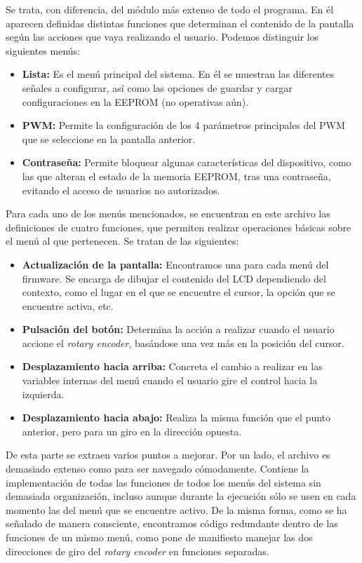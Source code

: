 Se trata, con diferencia, del módulo más extenso de todo el programa. En él aparecen definidas distintas funciones que determinan el contenido de la pantalla según las acciones que vaya realizando el usuario. Podemos distinguir los siguientes menús:

\begin{itemize}
    \item\textbf{Lista:} Es el menú principal del sistema. En él se muestran las diferentes señales a configurar, así como las opciones de guardar y cargar configuraciones en la EEPROM (no operativas aún).
    \item\textbf{PWM:} Permite la configuración de los 4 parámetros principales del PWM que se seleccione en la pantalla anterior.
    \item\textbf{Contraseña:} Permite bloquear algunas características del dispositivo, como las que alteran el estado de la memoria EEPROM, tras una contraseña, evitando el acceso de usuarios no autorizados.
\end{itemize}

Para cada uno de los menús mencionados, se encuentran en este archivo las definiciones de cuatro funciones, que permiten realizar operaciones básicas sobre el menú al que pertenecen. Se tratan de las siguientes:

\begin{itemize}
    \item\textbf{Actualización de la pantalla:} Encontramos una para cada menú del firmware. Se encarga de dibujar el contenido del LCD dependiendo del contexto, como el lugar en el que se encuentre el cursor, la opción que se encuentre activa, etc.
    \item\textbf{Pulsación del botón:} Determina la acción a realizar cuando el usuario accione el \textit{rotary encoder}, basándose una vez más en la posición del cursor.
    \item\textbf{Desplazamiento hacia arriba:} Concreta el cambio a realizar en las variables internas del menú cuando el usuario gire el control hacia la izquierda.
    \item\textbf{Desplazamiento hacia abajo:} Realiza la misma función que el punto anterior, pero para un giro en la dirección opuesta.
\end{itemize}

De esta parte se extraen varios puntos a mejorar. Por un lado, el archivo es demasiado extenso como para ser navegado cómodamente. Contiene la implementación de todas las funciones de todos los menús del sistema sin demasiada organización, incluso aunque durante la ejecución sólo se usen en cada momento las del menú que se encuentre activo. De la misma forma, como se ha señalado de manera consciente, encontramos código redundante dentro de las funciones de un mismo menú, como pone de manifiesto manejar las dos direcciones de giro del \textit{rotary encoder} en funciones separadas.


